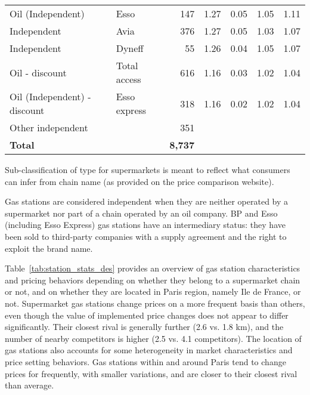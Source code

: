 \documentclass[english]{article}
\begin{document}
\begin{table}[H]
\begin{threeparttable}
\begin{tabular}{llrrrrr}
    Oil (Independent) & Esso  & 147   & 1.27  & 0.05  & 1.05  & 1.11 \\
    Independent & Avia  & 376   & 1.27  & 0.05  & 1.03  & 1.07 \\
    Independent & Dyneff & 55    & 1.26  & 0.04  & 1.05  & 1.07 \\
    Oil - discount & Total access & 616   & 1.16  & 0.03  & 1.02  & 1.04 \\
    Oil (Independent) - discount & Esso express & 318   & 1.16  & 0.02  & 1.02  & 1.04 \\
    Other independent &       & 351   &       &       &       &  \\
		\hline
    \textbf{Total} &       & \textbf{8,737} &       &       &       &  \\
    \hline
		\hline
\end{tabular}
\begin{tablenotes}
			\small
			\item Sub-classification of type for supermarkets is meant to reflect what consumers can infer from chain name (as provided on the price comparison website).
      \item Gas stations are considered independent when they are neither operated by a supermarket nor part of a chain operated by an oil company. BP and Esso (including Esso Express) gas stations  have an intermediary status: they have been sold to third-party companies with a supply agreement and the right to exploit the brand name.
\end{tablenotes}
\end{threeparttable}
\end{table}

Table~\ref{tab:station_stats_des} provides an overview of gas station characteristics and pricing behaviors depending on whether they belong to a supermarket chain or not, and on whether they are located in Paris region, namely Ile de France, or not. Supermarket gas stations change prices on a more frequent basis than others, even though the value of implemented price changes does not appear to differ significantly. Their closest rival is generally further (2.6 vs. 1.8 km), and the number of nearby competitors is higher (2.5 vs. 4.1 competitors). The location of gas stations also accounts for some heterogeneity in market characteristics and price setting behaviors. Gas stations within and around Paris tend to change prices for frequently, with smaller variations, and are closer to their closest rival than average.
\end{document}
